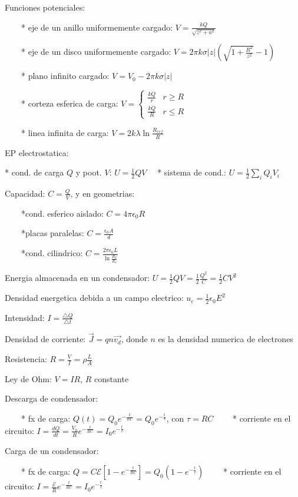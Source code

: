 \documentclass[10pt]{article}
\begin{document}
Funciones potenciales:

$\qquad${*} eje de un anillo uniformemente cargado: $V=\frac{kQ}{\sqrt{z^{2}+a^{2}}}$

$\qquad${*} eje de un disco uniformemente cargado: $V=2\pi k\sigma\left|z\right|\left(\sqrt{1+\frac{R^{2}}{z^{2}}}-1\right)$

$\qquad${*} plano infinito cargado: $V=V_{0}-2\pi k\sigma\left|z\right|$

$\qquad${*} corteza esferica de carga: $V=\begin{cases}
\frac{kQ}{r} & r\geq R\\
\frac{kQ}{R} & r\leq R
\end{cases}$

$\qquad${*} linea infinita de carga: $V=2k\lambda\ln\frac{R_{ref}}{R}$

EP electrostatica:

{*} cond. de carga $Q$ y poot. $V$: $U=\frac{1}{2}QV$ $\quad${*} sistema de cond.: $U=\frac{1}{2}\underset{i}{\sum}Q_{i}V_{i}$

Capacidad: $C=\frac{Q}{V}$, y en geometrias:

$\qquad${*}cond. esferico aislado: $C=4\pi\epsilon_{0}R$

$\qquad${*}placas paralelas: $C=\frac{\epsilon_{0}A}{d}$

$\qquad${*}cond. cilindrico: $C=\frac{2\pi\epsilon_{0}L}{\ln\frac{R_{2}}{R_{1}}}$

Energia almacenada en un condensador: $U=\frac{1}{2}QV=\frac{1}{2}\frac{Q^{2}}{C}=\frac{1}{2}CV^{2}$

Densidad energetica debida a un campo electrico: $u_{e}=\frac{1}{2}\epsilon_{0}E^{2}$

Intensidad: $I=\frac{\triangle Q}{\triangle t}$

Densidad de corriente: $\overrightarrow{J}=qn\overrightarrow{v_{d}}$,
donde $n$ es la densidad numerica de electrones

Resistencia: $R=\frac{V}{I}=\rho\frac{L}{A}$

Ley de Ohm: $V=IR$, $R$ constante

Descarga de condensador:

$\qquad${*} fx de carga: $Q(t)=Q_{0}e^{-\frac{t}{RC}}=Q_{0}e^{-\frac{t}{\tau}}$,
con $\tau=RC$ $\qquad${*} corriente en el circuito: $I=\frac{dQ}{dt}=\frac{V_{0}}{R}e^{-\frac{t}{RC}}=I_{0}e^{-\frac{t}{\tau}}$

Carga de un condensador:

$\qquad${*} fx de carga: $Q=C\mathscr{E\left[\mathit{\mathrm{1}-\mathrm{\mathit{e^{-\frac{t}{RC}}}}}\right]=\mathit{Q_{0}\left(\mathrm{1}-e^{-\frac{t}{\tau}}\right)}}$ $\qquad${*} corriente en el circuito: $I=\frac{\mathscr{E}}{R}e^{-\frac{t}{RC}}=I_{0}e^{-\frac{t}{\tau}}$
\end{document}
